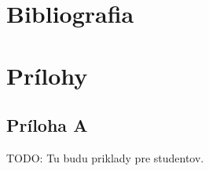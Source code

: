 \chapter*{Bibliografia}
\label{chap:bib}

\printbibliography

\chapter*{Prílohy}
\label{chap:pril}

\section*{Príloha A}
TODO: Tu budu priklady pre studentov.
